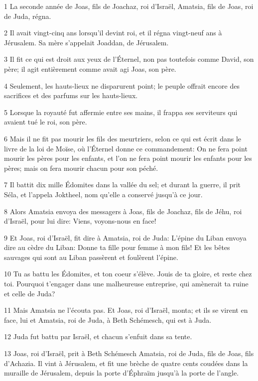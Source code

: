 \par 1 La seconde année de Joas, fils de Joachaz, roi d'Israël, Amatsia, fils de Joas, roi de Juda, régna.
\par 2 Il avait vingt-cinq ans lorsqu'il devint roi, et il régna vingt-neuf ans à Jérusalem. Sa mère s'appelait Joaddan, de Jérusalem.
\par 3 Il fit ce qui est droit aux yeux de l'Éternel, non pas toutefois comme David, son père; il agit entièrement comme avait agi Joas, son père.
\par 4 Seulement, les hauts-lieux ne disparurent point; le peuple offrait encore des sacrifices et des parfums sur les hauts-lieux.
\par 5 Lorsque la royauté fut affermie entre ses mains, il frappa ses serviteurs qui avaient tué le roi, son père.
\par 6 Mais il ne fit pas mourir les fils des meurtriers, selon ce qui est écrit dans le livre de la loi de Moïse, où l'Éternel donne ce commandement: On ne fera point mourir les pères pour les enfants, et l'on ne fera point mourir les enfants pour les pères; mais on fera mourir chacun pour son péché.
\par 7 Il battit dix mille Édomites dans la vallée du sel; et durant la guerre, il prit Séla, et l'appela Joktheel, nom qu'elle a conservé jusqu'à ce jour.
\par 8 Alors Amatsia envoya des messagers à Joas, fils de Joachaz, fils de Jéhu, roi d'Israël, pour lui dire: Viens, voyons-nous en face!
\par 9 Et Joas, roi d'Israël, fit dire à Amatsia, roi de Juda: L'épine du Liban envoya dire au cèdre du Liban: Donne ta fille pour femme à mon fils! Et les bêtes sauvages qui sont au Liban passèrent et foulèrent l'épine.
\par 10 Tu as battu les Édomites, et ton coeur s'élève. Jouis de ta gloire, et reste chez toi. Pourquoi t'engager dans une malheureuse entreprise, qui amènerait ta ruine et celle de Juda?
\par 11 Mais Amatsia ne l'écouta pas. Et Joas, roi d'Israël, monta; et ils se virent en face, lui et Amatsia, roi de Juda, à Beth Schémesch, qui est à Juda.
\par 12 Juda fut battu par Israël, et chacun s'enfuit dans sa tente.
\par 13 Joas, roi d'Israël, prit à Beth Schémesch Amatsia, roi de Juda, fils de Joas, fils d'Achazia. Il vint à Jérusalem, et fit une brèche de quatre cents coudées dans la muraille de Jérusalem, depuis la porte d'Éphraïm jusqu'à la porte de l'angle.
